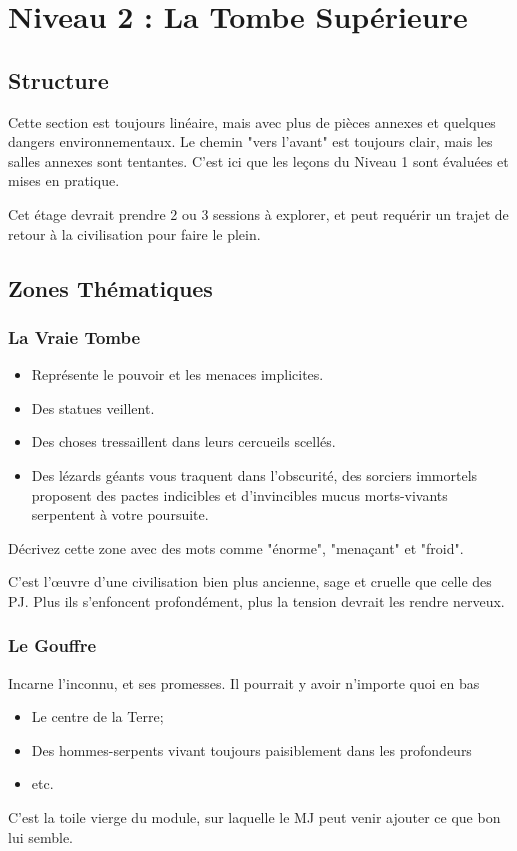 \chapter{Niveau 2 : La Tombe Supérieure}\label{n2}
\section{Structure}
Cette section est toujours linéaire, mais avec plus de pièces annexes et quelques dangers environnementaux.
Le chemin "vers l'avant" est toujours clair, mais les salles annexes sont tentantes.
C'est ici que les leçons du Niveau 1 sont évaluées et mises en pratique.

Cet étage devrait prendre 2 ou 3 sessions à explorer, et peut requérir un trajet de retour à la civilisation pour faire le plein.


\section{Zones Thématiques}
\subsection{La Vraie Tombe}
\begin{itemize}
  \item Représente le pouvoir et les menaces implicites.
  \item Des statues veillent.
  \item Des choses tressaillent dans leurs cercueils scellés.
  \item Des lézards géants vous traquent dans l'obscurité, des sorciers immortels proposent des pactes indicibles et d'invincibles mucus morts-vivants serpentent à votre poursuite.  
\end{itemize}

Décrivez cette zone avec des mots comme "énorme", "menaçant" et "froid".

C'est l'\oe uvre d'une civilisation bien plus ancienne, sage et cruelle que celle des PJ.
Plus ils s'enfoncent profondément, plus la tension devrait les rendre nerveux.

\subsection{Le Gouffre}
Incarne l’inconnu, et ses promesses. 
Il pourrait y avoir n’importe quoi en bas
\begin{itemize}
  \item Le centre de la Terre;
  \item Des hommes-serpents vivant toujours paisiblement dans les profondeurs
  \item etc. 
\end{itemize}
C’est la toile vierge du module, sur laquelle le MJ peut venir ajouter ce que bon lui semble.

